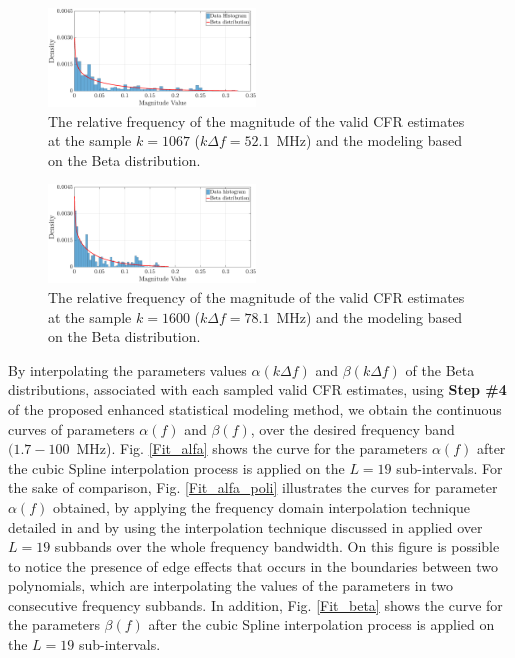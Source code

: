 \documentclass[journal]{IEEEtran}
\begin{document}
\begin{figure}[h!]
	\centering
	\includegraphics[width=0.49\textwidth]{images/Mag_hist_2.eps}
	\caption{The relative frequency of the magnitude of the valid \ac{CFR} estimates at the sample $k = 1067$ ($k\Delta f= 52.1$~MHz) and the modeling based on the Beta distribution.}
	\label{mag_example}
\end{figure}

\begin{figure}[h!]
	\centering
	\includegraphics[width=0.49\textwidth]{images/Mag_hist2_2.eps}
	\caption{The relative frequency of the magnitude of the valid \ac{CFR} estimates at the sample $k = 1600$ ($k\Delta f= 78.1$~MHz) and the modeling based on the Beta distribution.}
	\label{mag_example2}
\end{figure}

By interpolating the parameters values $\alpha(k\Delta f)$ and $\beta(k\Delta f)$ of the Beta distributions, associated with each sampled valid \ac{CFR} estimates, using \textbf{Step \#4} of the proposed enhanced statistical modeling method, we obtain the continuous curves of parameters $\alpha(f)$ and $\beta(f)$, over the desired frequency band $(1.7-100$~MHz). Fig. \ref{Fit_alfa} shows the curve for the parameters $\alpha(f)$ after the cubic Spline interpolation process is applied on the $L=19$ sub-intervals. For the sake of comparison, Fig. \ref{Fit_alfa_poli} illustrates the curves for parameter $\alpha(f)$ obtained, by applying the frequency domain interpolation technique detailed in \cite{mitra} and by using the interpolation technique discussed in \cite{Luis:AI} applied over $L=19$ subbands over the whole frequency bandwidth. On this figure is possible to notice the presence of edge effects that occurs in the boundaries between two polynomials, which are interpolating the values of the parameters in two consecutive frequency subbands. In addition, Fig. \ref{Fit_beta} shows the curve for the parameters $\beta(f)$ after the cubic Spline interpolation process is applied on the $L=19$ sub-intervals.
\end{document}
